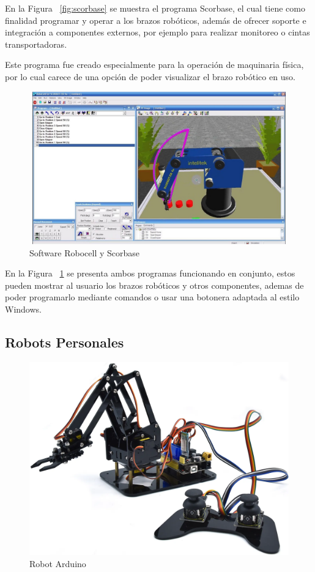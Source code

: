 En la Figura ~\ref{fig:scorbase} se muestra el programa Scorbase, el cual tiene como finalidad programar y operar a los brazos robóticos, además de ofrecer soporte e integración a componentes externos, por ejemplo para realizar monitoreo o cintas transportadoras.

Este programa fue creado especialmente para la operación de maquinaria física, por lo cual carece de una opción de poder visualizar el brazo robótico en uso.

\begin{figure}[ht]
\centering
\includegraphics[width=13cm, height=6.6cm]{figures/robocell scorbase.jpg}
\caption{Software Robocell y Scorbase}
\label{fig:robobase}
\end{figure}

En la Figura ~\ref{fig:robobase} se presenta ambos programas funcionando en conjunto, estos pueden mostrar al usuario los brazos robóticos y otros componentes, ademas de poder programarlo mediante comandos o usar una botonera adaptada al estilo Windows.

\clearpage

\subsection{Robots Personales}

\begin{figure}[ht]
\centering
\includegraphics[width=13cm]{figures/Brazo robotico.png}
\caption{Robot Arduino}
\label{fig:robotarduino}
\end{figure}

